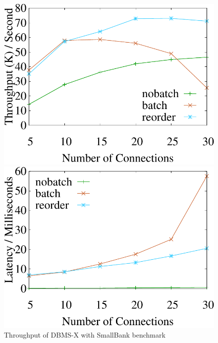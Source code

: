 \begin{figure}[t]
	\centering
	\begin{minipage}[b]{0.31\linewidth}
		\centering
		\includegraphics[width=\textwidth]{./exp_fig/hekaton/pdf/hekaton_tps}
		\caption{Throughput of DBMS-X with SmallBank benchmark}
		\label{fig:hekaton:tps}
	\end{minipage}
	\begin{minipage}[b]{0.31\linewidth}
		\centering
		\includegraphics[width=\textwidth]{./exp_fig/hekaton/pdf/hekaton_latency}

\end{minipage}
\end{figure}
